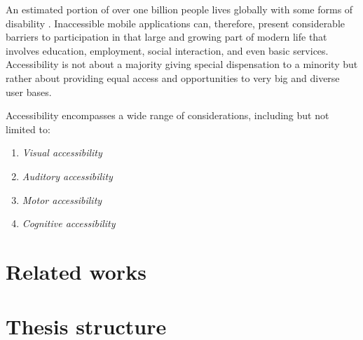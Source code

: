 An estimated portion of over one billion people lives globally with some forms of disability \cite{article:who-disability}. Inaccessible mobile applications can, therefore, present considerable barriers to participation in that large and growing part of modern life that involves education, employment, social interaction, and even basic services. Accessibility is not about a majority giving special dispensation to a minority but rather about providing equal access and opportunities to very big and diverse user bases.

Accessibility encompasses a wide range of considerations, including but not limited to:
\begin{enumerate}
    \item \textit{Visual accessibility}

    \item \textit{Auditory accessibility}

    \item \textit{Motor accessibility}

    \item \textit{Cognitive accessibility}
\end{enumerate}

\section{Related works}
\label{chap:intro-related-works}

\section{Thesis structure}
\label{chap:intro-structure} 

